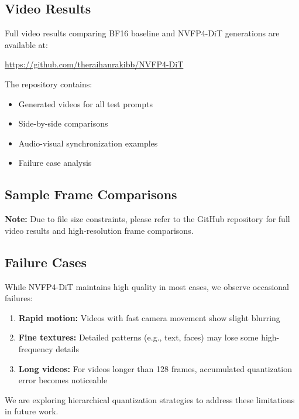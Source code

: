 \documentclass[journal]{IEEEtran}
\theoremstyle{definition}
\theoremstyle{remark}
\begin{document}
\subsection{Video Results}

Full video results comparing BF16 baseline and NVFP4-DiT generations are available at:

\url{https://github.com/theraihanrakibb/NVFP4-DiT}

The repository contains:
\begin{itemize}
    \item Generated videos for all test prompts
    \item Side-by-side comparisons
    \item Audio-visual synchronization examples
    \item Failure case analysis
\end{itemize}

\subsection{Sample Frame Comparisons}

\textbf{Note:} Due to file size constraints, please refer to the GitHub repository for full video results and high-resolution frame comparisons.

\subsection{Failure Cases}

While NVFP4-DiT maintains high quality in most cases, we observe occasional failures:

\begin{enumerate}
    \item \textbf{Rapid motion:} Videos with fast camera movement show slight blurring
    \item \textbf{Fine textures:} Detailed patterns (e.g., text, faces) may lose some high-frequency details
    \item \textbf{Long videos:} For videos longer than 128 frames, accumulated quantization error becomes noticeable
\end{enumerate}

We are exploring hierarchical quantization strategies to address these limitations in future work.
\end{document}
